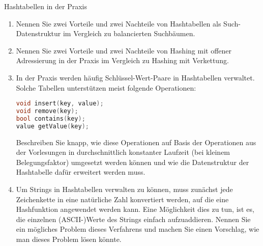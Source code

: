 \documentclass[11pt,a4paper]{article}
\begin{document}
\begin{aufgabe}{3}{Hashtabellen in der Praxis}
    \begin{enumerate}
        \item Nennen Sie zwei Vorteile und zwei Nachteile von Hashtabellen als Such-Datenstruktur im Vergleich zu balancierten Suchbäumen.
        \item Nennen Sie zwei Vorteile und zwei Nachteile von Hashing mit offener Adressierung in der Praxis im Vergleich zu Hashing mit Verkettung.
        \item In der Praxis werden häufig Schlüssel-Wert-Paare in Hashtabellen verwaltet.
        Solche Tabellen unterstützen meist folgende Operationen:
        \begin{lstlisting}[language=c++]
void insert(key, value);
void remove(key);
bool contains(key);
value getValue(key);
        \end{lstlisting}
        Beschreiben Sie knapp, wie diese Operationen auf Basis der Operationen aus der Vorlesungen in durchschnittlich konstanter Laufzeit (bei kleinem Belegungsfaktor) umgesetzt werden können und wie die Datenstruktur der Hashtabelle dafür erweitert werden muss.
        \item Um Strings in Hashtabellen verwalten zu können, muss zunächst jede Zeichenkette in eine natürliche Zahl konvertiert werden, auf die eine Hashfunktion angewendet werden kann.
        Eine Möglichkeit dies zu tun, ist es, die einzelnen (ASCII-)Werte des Strings einfach aufzuaddieren.
        Nennen Sie ein mögliches Problem dieses Verfahrens und machen Sie einen Vorschlag, wie man dieses Problem lösen könnte.
    \end{enumerate}
\end{aufgabe}
\end{document}
